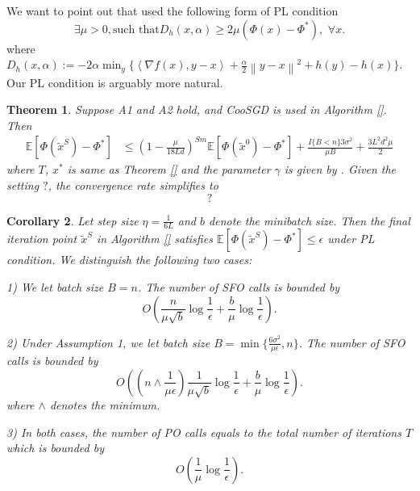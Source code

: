 \documentclass{article}
\newcommand*{\E}{\mathbb{E}}
\newcommand{\norm}[1]{\left\lVert#1\right\rVert}
\newcommand{\Iprod}[2]{\left\langle #1,#2\right\rangle}
\newtheorem{theorem}{Theorem}[section]
\newtheorem{corollary}[theorem]{Corollary}
\theoremstyle{definition}
\theoremstyle{remark}
\begin{document}
We want to point out that \cite{} used the following form of PL condition
 \begin{equation}
\exists \mu >0, \text{such~that} D_h(x,\alpha) \geq 2\mu (\Phi(x) - \Phi^*),\,\, \forall x.
\end{equation} 
where $D_h(x,\alpha) := -2\alpha \min_y\{\Iprod{\nabla f(x)}{y-x} + \frac{\alpha}{2}\norm{y-x}^2+h(y)-h(x)\}$. Our PL condition is arguably more natural.
\begin{theorem}
Suppose  A1  and  A2  hold,  and  CooSGD  is  used  in  Algorithm \ref{}. Then 
\begin{equation}
\begin{split}
\E[\Phi(\widetilde{x}^S) - {\Phi}^*] & \leq \left(1-\frac{\mu}{18Ld}\right)^{Sm} \E[\Phi(\widetilde{x}^0) - {\Phi}^*] + \frac{I\{B < n\}3 \sigma ^2}{\mu B} + \frac{3 L^2 d^2 \mu}{2}
\end{split}
\end{equation}
where $T$, $x^*$ is same as Theorem \ref{} and the parameter $\gamma$ is given by . Given the setting $?$, the convergence rate simplifies to 
\[
?
\]
\end{theorem}
\begin{corollary}
Let step size $\eta = \frac{1}{6L}$ and $b$ denote the minibatch size. Then the final iteration point $\tilde{x}^S$ in Algorithm \ref{} satisfies $\E[\Phi(\tilde{x}^S) - \Phi^*]\leq \epsilon$ under PL condition. We distinguish the following two cases:

1) We let batch size $B = n$. The number of SFO calls is bounded by
\[
O\left(\frac{n}{\mu \sqrt{b}}\log \frac{1}{\epsilon}+\frac{b}{\mu}\log\frac{1}{\epsilon}\right).
\]

2) Under Assumption 1, we let batch size $B = \min\{\frac{6\sigma^2}{\mu\epsilon},n\}$. The number of SFO calls is bounded by
\[
O\left((n\wedge\frac{1}{\mu \epsilon})\frac{1}{\mu \sqrt{b}}\log \frac{1}{\epsilon}+\frac{b}{\mu}\log\frac{1}{\epsilon}\right).
\]
where $\wedge$ denotes the minimum.

3) In both cases, the number of PO calls equals to the total number of iterations $T$ which is bounded by
\[
O\left(\frac{1}{\mu}\log\frac{1}{\epsilon}\right).
\]
\end{corollary}
\end{document}
